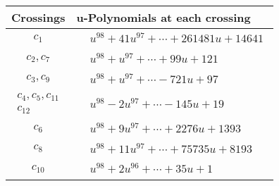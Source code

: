 \documentclass[1p]{elsarticle_modified}
\theoremstyle{definition}
\begin{document}
\begin{tabular}{m{50pt}|m{274pt}}
Crossings & \hspace{64pt}u-Polynomials at each crossing \\
\hline $$\begin{aligned}c_{1}\end{aligned}$$&$\begin{aligned}
&u^{98}+41 u^{97}+\cdots+261481 u+14641
\end{aligned}$\\
\hline $$\begin{aligned}c_{2},c_{7}\end{aligned}$$&$\begin{aligned}
&u^{98}+u^{97}+\cdots+99 u+121
\end{aligned}$\\
\hline $$\begin{aligned}c_{3},c_{9}\end{aligned}$$&$\begin{aligned}
&u^{98}+u^{97}+\cdots-721 u+97
\end{aligned}$\\
\hline $$\begin{aligned}c_{4},c_{5},c_{11}\\c_{12}\end{aligned}$$&$\begin{aligned}
&u^{98}-2 u^{97}+\cdots-145 u+19
\end{aligned}$\\
\hline $$\begin{aligned}c_{6}\end{aligned}$$&$\begin{aligned}
&u^{98}+9 u^{97}+\cdots+2276 u+1393
\end{aligned}$\\
\hline $$\begin{aligned}c_{8}\end{aligned}$$&$\begin{aligned}
&u^{98}+11 u^{97}+\cdots+75735 u+8193
\end{aligned}$\\
\hline $$\begin{aligned}c_{10}\end{aligned}$$&$\begin{aligned}
&u^{98}+2 u^{96}+\cdots+35 u+1
\end{aligned}$\\
\hline
\end{tabular}\\~\\
\end{document}
